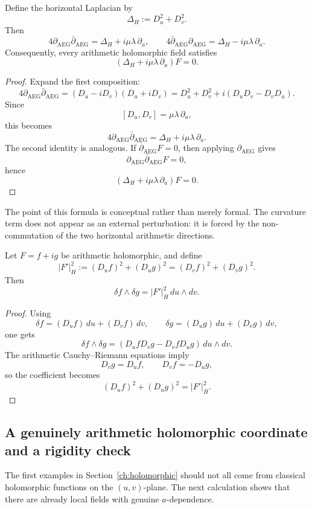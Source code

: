 \begin{proposition}
\label{prop:appD-factorization}
Define the horizontal Laplacian by
\[
\Delta_H:=D_u^2+D_v^2.
\]
Then
\[
4\partial_{\mathrm{AEG}}\bar\partial_{\mathrm{AEG}}
=\Delta_H+i\mu\lambda\,\partial_a,
\qquad
4\bar\partial_{\mathrm{AEG}}\partial_{\mathrm{AEG}}
=\Delta_H-i\mu\lambda\,\partial_a.
\]
Consequently, every arithmetic holomorphic field satisfies
\[
(\Delta_H+i\mu\lambda\,\partial_a)F=0.
\]
\end{proposition}

\begin{proof}
Expand the first composition:
\[
4\partial_{\mathrm{AEG}}\bar\partial_{\mathrm{AEG}}
=(D_u-iD_v)(D_u+iD_v)
=D_u^2+D_v^2+i(D_uD_v-D_vD_u).
\]
Since
\[
[D_u,D_v]=\mu\lambda\,\partial_a,
\]
this becomes
\[
4\partial_{\mathrm{AEG}}\bar\partial_{\mathrm{AEG}}
=\Delta_H+i\mu\lambda\,\partial_a.
\]
The second identity is analogous.
If $\bar\partial_{\mathrm{AEG}}F=0$, then applying $\partial_{\mathrm{AEG}}$ gives
\[
\partial_{\mathrm{AEG}}\bar\partial_{\mathrm{AEG}}F=0,
\]
hence
\[
(\Delta_H+i\mu\lambda\,\partial_a)F=0.
\]
\end{proof}

The point of this formula is conceptual rather than merely formal. The curvature term does not appear as an external perturbation: it is forced by the non-commutation of the two horizontal arithmetic directions.

\begin{corollary}
\label{cor:appD-horizontal-jacobian}
Let $F=f+ig$ be arithmetic holomorphic, and define
\[
|F'|_H^2:=(D_uf)^2+(D_ug)^2=(D_vf)^2+(D_vg)^2.
\]
Then
\[
\delta f\wedge\delta g=|F'|_H^2\,du\wedge dv.
\]
\end{corollary}

\begin{proof}
Using
\[
\delta f=(D_uf)\,du+(D_vf)\,dv,
\qquad
\delta g=(D_ug)\,du+(D_vg)\,dv,
\]
one gets
\[
\delta f\wedge\delta g
=(D_ufD_vg-D_vfD_ug)\,du\wedge dv.
\]
The arithmetic Cauchy--Riemann equations imply
\[
D_vg=D_uf,
\qquad
D_vf=-D_ug,
\]
so the coefficient becomes
\[
(D_uf)^2+(D_ug)^2=|F'|_H^2.
\]
\end{proof}

\subsection{A genuinely arithmetic holomorphic coordinate and a rigidity check}
\label{appD:explicit-zeta}

The first examples in Section~\ref{ch:holomorphic} should not all come from classical holomorphic functions on the $(u,v)$-plane. The next calculation shows that there are already local fields with genuine $a$-dependence.

